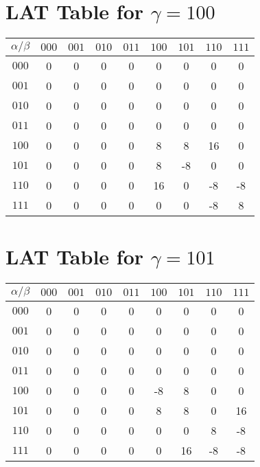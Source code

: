 \documentclass{article}
\begin{document}
\section*{LAT Table for $\gamma = 100$}\n\begin{center}
\begin{tabular}{c|cccccccc}
 $ \alpha / \beta $ & $000$ & $001$ & $010$ & $011$ & $100$ & $101$ & $110$ & $111$  \\
\midrule
$000$ & 0 & 0 & 0 & 0 & 0 & 0 & 0 & 0  \\
$001$ & 0 & 0 & 0 & 0 & 0 & 0 & 0 & 0  \\
$010$ & 0 & 0 & 0 & 0 & 0 & 0 & 0 & 0  \\
$011$ & 0 & 0 & 0 & 0 & 0 & 0 & 0 & 0  \\
$100$ & 0 & 0 & 0 & 0 & 8 & 8 & 16 & 0  \\
$101$ & 0 & 0 & 0 & 0 & 8 & -8 & 0 & 0  \\
$110$ & 0 & 0 & 0 & 0 & 16 & 0 & -8 & -8  \\
$111$ & 0 & 0 & 0 & 0 & 0 & 0 & -8 & 8  \\
\end{tabular}
\end{center}

\section*{LAT Table for $\gamma = 101$}\n\begin{center}
\begin{tabular}{c|cccccccc}
 $ \alpha / \beta $ & $000$ & $001$ & $010$ & $011$ & $100$ & $101$ & $110$ & $111$  \\
\midrule
$000$ & 0 & 0 & 0 & 0 & 0 & 0 & 0 & 0  \\
$001$ & 0 & 0 & 0 & 0 & 0 & 0 & 0 & 0  \\
$010$ & 0 & 0 & 0 & 0 & 0 & 0 & 0 & 0  \\
$011$ & 0 & 0 & 0 & 0 & 0 & 0 & 0 & 0  \\
$100$ & 0 & 0 & 0 & 0 & -8 & 8 & 0 & 0  \\
$101$ & 0 & 0 & 0 & 0 & 8 & 8 & 0 & 16  \\
$110$ & 0 & 0 & 0 & 0 & 0 & 0 & 8 & -8  \\
$111$ & 0 & 0 & 0 & 0 & 0 & 16 & -8 & -8  \\
\end{tabular}
\end{center}
\end{document}
